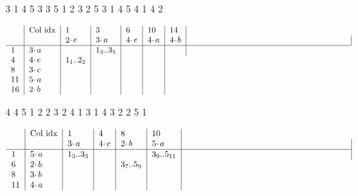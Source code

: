 \documentclass{article}
\begin{document}
3 1   4 5   3 3   5 1   2 3
2 5   3 1   4 5   4 1   4 2


\[ \begin{tabular} {l | l | *{5}{l|} p{66mm} | }
& Col idx & 1 & 3 & 6 & 10 & 14   \\
 & & $2 \cdotp e$ & $3 \cdotp a$ & $4 \cdotp e$ & $4 \cdotp a$ & $4 \cdotp b$ &    \\
\hline 
1 & $3 \cdotp a$  &   & $1_{3}$..$3_{5}$   &     &   &    \\
4 & $4 \cdotp e$  & $1_{1}$..$2_{2}$  &     &   &    \\
8 & $3 \cdotp c$  &   &     &   &    \\
11 & $5 \cdotp a$  &   &     &   &    \\
16 & $2 \cdotp b$  &   &     &   &    \\
\end{tabular} \]

4 4
5 1    2 2    3 2     4 1
3 1    4 3    2 2     5 1

\[ \begin{tabular} {l | l | *{4}{l|} p{66mm} | }
& Col idx & 1 & 4 & 8 & 10    \\
 & & $3 \cdotp a$ & $4 \cdotp c$ & $2 \cdotp b$ & $5 \cdotp a$  &    \\
\hline 
1 & $5 \cdotp a$  &  $1_{3}$..$3_{3}$  &   &     &  $3_{9}$..$5_{11}$  &    \\
6 & $2 \cdotp b$  &   &     & $3_{7}$..$5_{9}$  &    \\
8 & $3 \cdotp b$  &   &     &   &    \\
11 & $4 \cdotp a$  &   &     &   &    \\

\end{tabular} \]
\end{document}
